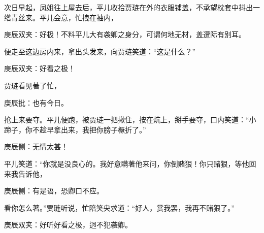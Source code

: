 \begin{parag}
    次日早起，凤姐往上屋去后，平儿收拾贾琏在外的衣服铺盖，不承望枕套中抖出一绺青丝来。平儿会意，忙拽在袖内，\begin{note}庚辰双夹：好极！不料平儿大有袭卿之身分，可谓何地无材，盖遭际有别耳。\end{note}便走至这边房内来，拿出头发来，向贾琏笑道：“这是什么？”\begin{note}庚辰双夹：好看之极！\end{note}贾琏看见著了忙，\begin{note}庚辰批：也有今日。\end{note}抢上来要夺。平儿便跑，被贾琏一把揪住，按在炕上，掰手要夺，口内笑道：“小蹄子，你不趁早拿出来，我把你膀子橛折了。”\begin{note}庚辰侧：无情太甚！\end{note}平儿笑道：“你就是没良心的。我好意瞒著他来问，你倒赌狠！你只赌狠，等他回来我告诉他，\begin{note}庚辰侧：有是语，恐卿口不应。\end{note}看你怎么著。”贾琏听说，忙陪笑央求道：“好人，赏我罢，我再不赌狠了。”\begin{note}庚辰双夹：好听好看之极，迥不犯袭卿。\end{note}
\end{parag}


